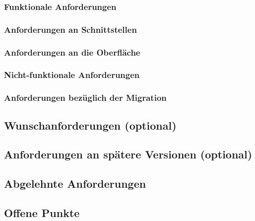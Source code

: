 \documentclass[12pt]{article}
\begin{document}
\subsubsection{Funktionale Anforderungen}
\subsubsection{Anforderungen an Schnittstellen}
\subsubsection{Anforderungen an die Oberfläche}
\subsubsection{Nicht-funktionale Anforderungen}
\subsubsection{Anforderungen bezüglich der Migration}

\subsection{Wunschanforderungen (optional)}

\subsection{Anforderungen an spätere Versionen (optional)}

\subsection{Abgelehnte Anforderungen}

\subsection{Offene Punkte}
\end{document}
